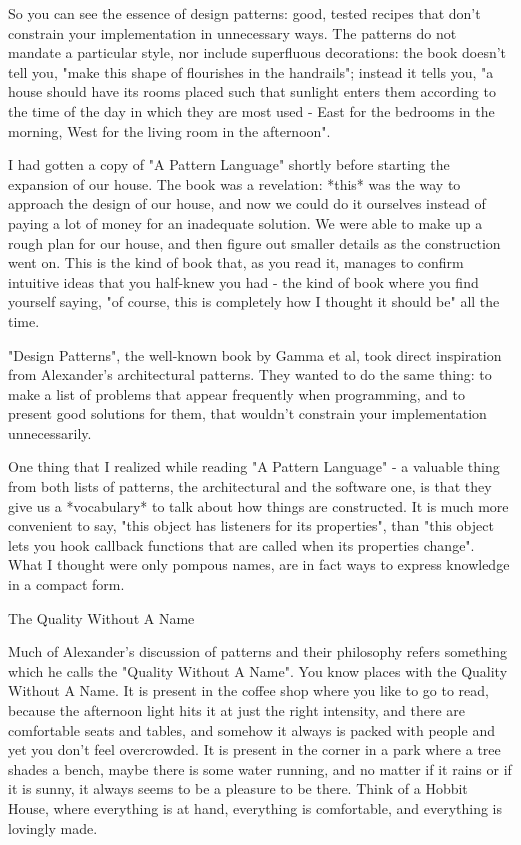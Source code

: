 So you can see the essence of design patterns:  good, tested recipes that don't constrain your implementation in unnecessary ways.  The patterns do not mandate a particular style, nor include superfluous decorations:  the book doesn't tell you, "make this shape of flourishes in the handrails"; instead it tells you, "a house should have its rooms placed such that sunlight enters them according to the time of the day in which they are most used - East for the bedrooms in the morning, West for the living room in the afternoon".

I had gotten a copy of "A Pattern Language" shortly before starting the expansion of our house.  The book was a revelation:  *this* was the way to approach the design of our house, and now we could do it ourselves instead of paying a lot of money for an inadequate solution.  We were able to make up a rough plan for our house, and then figure out smaller details as the construction went on.  This is the kind of book that, as you read it, manages to confirm intuitive ideas that you half-knew you had - the kind of book where you find yourself saying, "of course, this is completely how I thought it should be" all the time.

"Design Patterns", the well-known book by Gamma et al, took direct inspiration from Alexander's architectural patterns.  They wanted to do the same thing:  to make a list of problems that appear frequently when programming, and to present good solutions for them, that wouldn't constrain your implementation unnecessarily.

One thing that I realized while reading "A Pattern Language" - a valuable thing from both lists of patterns, the architectural and the software one, is that they give us a *vocabulary* to talk about how things are constructed.  It is much more convenient to say, "this object has listeners for its properties", than "this object lets you hook callback functions that are called when its properties change". What I thought were only pompous names, are in fact ways to express knowledge in a compact form.

The Quality Without A Name

Much of Alexander's discussion of patterns and their philosophy refers something which he calls the "Quality Without A Name".  You know places with the Quality Without A Name.  It is present in the coffee shop where you like to go to read, because the afternoon light hits it at just the right intensity, and there are comfortable seats and tables, and somehow it always is packed with people and yet you don't feel overcrowded.  It is present in the corner in a park where a tree shades a bench, maybe there is some water running, and no matter if it rains or if it is sunny, it always seems to be a pleasure to be there. Think of a Hobbit House, where everything is at hand, everything is comfortable, and everything is lovingly made.

